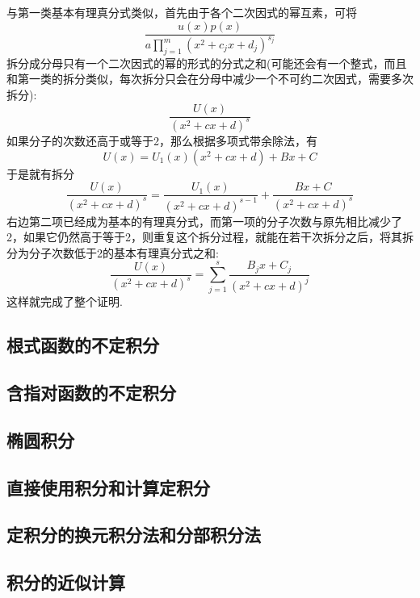 与第一类基本有理真分式类似，首先由于各个二次因式的幂互素，可将
\[ \frac{u(x)p(x)}{a \prod_{j=1}^m(x^2+c_j x + d_j)^{s_j}} \]
拆分成分母只有一个二次因式的幂的形式的分式之和(可能还会有一个整式，而且和第一类的拆分类似，每次拆分只会在分母中减少一个不可约二次因式，需要多次拆分):
\[ \frac{U(x)}{(x^2+cx+d)^s} \]
如果分子的次数还高于或等于2，那么根据多项式带余除法，有
\[ U(x)=U_1(x)(x^2+cx+d)+Bx+C \]
于是就有拆分
\[ \frac{U(x)}{(x^2+cx+d)^s} = \frac{U_1(x)}{(x^2+cx+d)^{s-1}} + \frac{Bx+C}{(x^2+cx+d)^s} \]
右边第二项已经成为基本的有理真分式，而第一项的分子次数与原先相比减少了2，如果它仍然高于等于2，则重复这个拆分过程，就能在若干次拆分之后，将其拆分为分子次数低于2的基本有理真分式之和:
\[ \frac{U(x)}{(x^2+cx+d)^s} = \sum_{j=1}^s \frac{B_jx+C_j}{(x^2+cx+d)^{j}} \]
这样就完成了整个证明.




\subsection{根式函数的不定积分}
\label{sec:indefinite-integration-of-irrational-function}

\subsection{含指对函数的不定积分}
\label{sec:indefinite-integration-of-exp-log-function}

\subsection{椭圆积分}
\label{sec:elliptic-integral}

\subsection{直接使用积分和计算定积分}
\label{sec:computation-of-definite-integral-by-riemann-sum}

\subsection{定积分的换元积分法和分部积分法}
\label{sec:definite-integral-by-substitution-or-partial}

\subsection{积分的近似计算}
\label{sec:approx-computation-of-integral}





